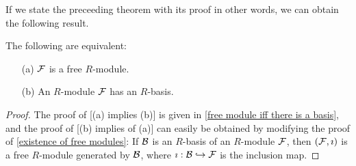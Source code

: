 If we state the preceeding theorem with its proof in other words, we can obtain the following result.
\begin{thm}
    The following are equivalent:
    \begin{enumerate}
        \item[(a)]
        {
            ${\mathcal{F}}$ is a free $R$-module.
        }
        \item[(b)]
        {
            An $R$-module ${\mathcal{F}}$ has an $R$-basis.
        }
    \end{enumerate}
\end{thm}
\begin{proof}
    The proof of [(a) implies (b)] is given in \cref{free module iff there is a basis}, and the proof of [(b) implies of (a)] can easily be obtained by modifying the proof of \cref{existence of free modules}: If ${\mathcal{B}}$ is an $R$-basis of an $R$-module ${\mathcal{F}}$, then $({\mathcal{F}}, \imath)$ is a free $R$-module generated by ${\mathcal{B}}$, where $\imath: {\mathcal{B}}\hookrightarrow{\mathcal{F}}$ is the inclusion map.
\end{proof}
